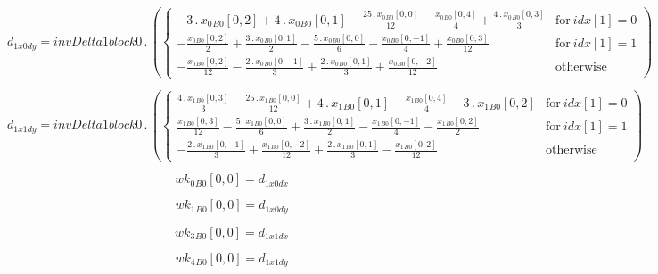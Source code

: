 \documentclass{article}
\begin{document}
\begin{dmath}d_{1 x0 dy} = invDelta1block0 \,.\, \left(\begin{cases} - 3 \,.\, {x_{0}{_{B0}}}[{0,2}] + 4 \,.\, {x_{0}{_{B0}}}[{0,1}] - \frac{25 \,.\, {x_{0}{_{B0}}}[{0,0}]}{12} - \frac{{x_{0}{_{B0}}}[{0,4}]}{4} + \frac{4 \,.\, 
{x_{0}{_{B0}}}[{0,3}]}{3} & \text{for}\: {idx}[{1}] = 0 \\- \frac{{x_{0}{_{B0}}}[{0,2}]}{2} + \frac{3 \,.\, {x_{0}{_{B0}}}[{0,1}]}{2} - \frac{5 \,.\, {x_{0}{_{B0}}}[{0,0}]}{6} - \frac{{x_{0}{_{B0}}}[{0,-1}]}{4} + \frac{{x_{0}{_{B0}}}[{0,3}]}{12} & 
\text{for}\: {idx}[{1}] = 1 \\- \frac{{x_{0}{_{B0}}}[{0,2}]}{12} - \frac{2 \,.\, {x_{0}{_{B0}}}[{0,-1}]}{3} + \frac{2 \,.\, {x_{0}{_{B0}}}[{0,1}]}{3} + \frac{{x_{0}{_{B0}}}[{0,-2}]}{12} & \text{otherwise} \end{cases}\right)\end{dmath}

\begin{dmath}d_{1 x1 dy} = invDelta1block0 \,.\, \left(\begin{cases} \frac{4 \,.\, {x_{1}{_{B0}}}[{0,3}]}{3} - \frac{25 \,.\, {x_{1}{_{B0}}}[{0,0}]}{12} + 4 \,.\, {x_{1}{_{B0}}}[{0,1}] - \frac{{x_{1}{_{B0}}}[{0,4}]}{4} - 3 \,.\, {x_{1}{_{B0}}}[{0,2}] 
& \text{for}\: {idx}[{1}] = 0 \\\frac{{x_{1}{_{B0}}}[{0,3}]}{12} - \frac{5 \,.\, {x_{1}{_{B0}}}[{0,0}]}{6} + \frac{3 \,.\, {x_{1}{_{B0}}}[{0,1}]}{2} - \frac{{x_{1}{_{B0}}}[{0,-1}]}{4} - \frac{{x_{1}{_{B0}}}[{0,2}]}{2} & \text{for}\: {idx}[{1}] = 1 
\\- \frac{2 \,.\, {x_{1}{_{B0}}}[{0,-1}]}{3} + \frac{{x_{1}{_{B0}}}[{0,-2}]}{12} + \frac{2 \,.\, {x_{1}{_{B0}}}[{0,1}]}{3} - \frac{{x_{1}{_{B0}}}[{0,2}]}{12} & \text{otherwise} \end{cases}\right)\end{dmath}

\begin{dmath}{wk_{0}{_{B0}}}[{0,0}] = d_{1 x0 dx}\end{dmath}

\begin{dmath}{wk_{1}{_{B0}}}[{0,0}] = d_{1 x0 dy}\end{dmath}

\begin{dmath}{wk_{3}{_{B0}}}[{0,0}] = d_{1 x1 dx}\end{dmath}

\begin{dmath}{wk_{4}{_{B0}}}[{0,0}] = d_{1 x1 dy}\end{dmath}
\end{document}
